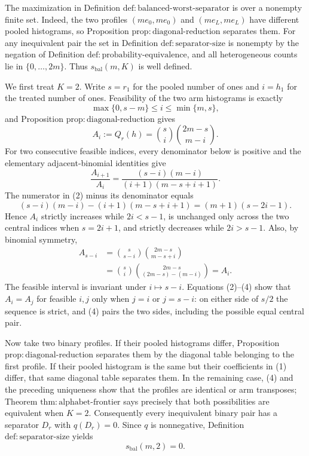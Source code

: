 The maximization in Definition \(\mathrm{def{:}balanced\text{-}worst\text{-}separator}\) is over a nonempty finite set. Indeed, the two profiles \((me_0,me_0)\) and \((me_L,me_L)\) have different pooled histograms, so Proposition \(\mathrm{prop{:}diagonal\text{-}reduction}\) separates them. For any inequivalent pair the set in Definition \(\mathrm{def{:}separator\text{-}size}\) is nonempty by the negation of Definition \(\mathrm{def{:}probability\text{-}equivalence}\), and all heterogeneous counts lie in \(\{0,\ldots,2m\}\). Thus \(s_{\mathrm{bal}}(m,K)\) is well defined.

We first treat \(K=2\). Write \(s=r_1\) for the pooled number of ones and \(i=h_1\) for the treated number of ones. Feasibility of the two arm histograms is exactly
\[
\max\{0,s-m\}\leq i\leq\min\{m,s\},
\]
and Proposition \(\mathrm{prop{:}diagonal\text{-}reduction}\) gives
\[
A_i:=Q_r(h)=\binom{s}{i}\binom{2m-s}{m-i}. \tag{1}
\]
For two consecutive feasible indices, every denominator below is positive and the elementary adjacent-binomial identities give
\[
\frac{A_{i+1}}{A_i}
=
\frac{(s-i)(m-i)}
{(i+1)(m-s+i+1)}. \tag{2}
\]
The numerator in (2) minus its denominator equals
\[
(s-i)(m-i)-(i+1)(m-s+i+1)
=(m+1)(s-2i-1). \tag{3}
\]
Hence \(A_i\) strictly increases while \(2i<s-1\), is unchanged only across the two central indices when \(s=2i+1\), and strictly decreases while \(2i>s-1\). Also, by binomial symmetry,
\[
\begin{aligned}
A_{s-i}
&=\binom{s}{s-i}\binom{2m-s}{m-s+i}\\
&=\binom{s}{i}\binom{2m-s}{(2m-s)-(m-i)}
=A_i. \tag{4}
\end{aligned}
\]
The feasible interval is invariant under \(i\mapsto s-i\). Equations (2)--(4) show that \(A_i=A_j\) for feasible \(i,j\) only when \(j=i\) or \(j=s-i\): on either side of \(s/2\) the sequence is strict, and (4) pairs the two sides, including the possible equal central pair.

Now take two binary profiles. If their pooled histograms differ, Proposition \(\mathrm{prop{:}diagonal\text{-}reduction}\) separates them by the diagonal table belonging to the first profile. If their pooled histogram is the same but their coefficients in (1) differ, that same diagonal table separates them. In the remaining case, (4) and the preceding uniqueness show that the profiles are identical or arm transposes; Theorem \(\mathrm{thm{:}alphabet\text{-}frontier}\) says precisely that both possibilities are equivalent when \(K=2\). Consequently every inequivalent binary pair has a separator \(D_r\) with \(q(D_r)=0\). Since \(q\) is nonnegative, Definition \(\mathrm{def{:}separator\text{-}size}\) yields
\[
s_{\mathrm{bal}}(m,2)=0. \tag{5}
\]

